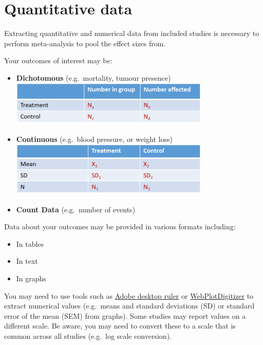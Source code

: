 \documentclass[
]{book}
\providecommand{\tightlist}{%
  \setlength{\itemsep}{0pt}\setlength{\parskip}{0pt}}
\begin{document}
\hypertarget{quantitative-data}{%
\section{Quantitative data}\label{quantitative-data}}

Extracting quantitative and numerical data from included studies is necessary to perform meta-analysis to pool the effect sizes from.

Your outcomes of interest may be:

\begin{itemize}
\item
  \textbf{Dichotomous} (e.g.~mortality, tumour presence) \includegraphics[width=0.75\textwidth,height=0.75\textheight]{figs/dichot-outcome.png}
\item
  \textbf{Continuous} (e.g.~blood pressure, or weight loss) \includegraphics[width=0.75\textwidth,height=0.75\textheight]{figs/contin-outcome.png}
\item
  \textbf{Count Data} (e.g.~number of events)
\end{itemize}

Data about your outcomes may be provided in various formats including:

\begin{itemize}
\tightlist
\item
  In tables
\item
  In text
\item
  In graphs
\end{itemize}

You may need to use tools such as \href{https://helpx.adobe.com/acrobat/using/grids-guides-measurements-pdfs.html}{Adobe desktop ruler} or \href{https://automeris.io/WebPlotDigitizer/}{WebPlotDigitizer} to extract numerical values (e.g.~means and standard deviations (SD) or standard error of the mean (SEM) from graphs). Some studies may report values on a different scale. Be aware, you may need to convert these to a scale that is common across all studies (e.g.~log scale conversion).
\end{document}
